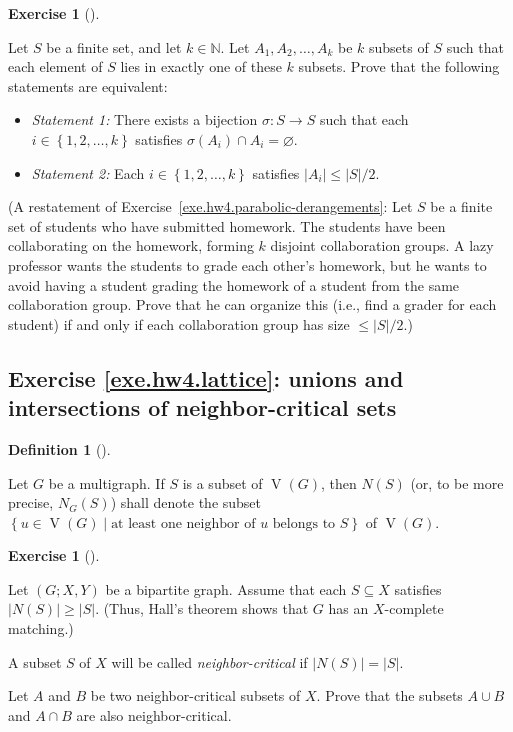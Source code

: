 \documentclass[numbers=enddot,12pt,final,onecolumn,notitlepage]{scrartcl}%
\newcounter{exer}
\theoremstyle{definition}
\newtheorem{defi}[theo]{Definition}
\newenvironment{definition}[1][]
{\begin{defi}[#1]\begin{leftbar}}
{\end{leftbar}\end{defi}}
\newtheorem{exmp}[exer]{Exercise}
\newenvironment{exercise}[1][]
{\begin{exmp}[#1]\begin{leftbar}}
{\end{leftbar}\end{exmp}}
\newcommand{\NN}{\mathbb{N}}
\newcommand{\set}[1]{\left\{ #1 \right\}}
\newcommand{\abs}[1]{\left| #1 \right|}
\newcommand{\tup}[1]{\left( #1 \right)}
\newcommand{\verts}[1]{\operatorname{V}\left( #1 \right)}
\begin{document}
\begin{exercise} \label{exe.hw4.parabolic-derangements}
Let $S$ be a finite set, and let $k \in \NN$.
Let $A_1, A_2, \ldots, A_k$ be $k$ subsets of $S$
such that each element of $S$ lies in exactly one of these $k$
subsets.
Prove that the following statements are equivalent:

\begin{itemize}
\item \textit{Statement 1:} There exists a bijection
      $\sigma : S \to S$ such that each $i \in \set{1, 2, \ldots, k}$
      satisfies $\sigma \tup{A_i} \cap A_i = \varnothing$.
\item \textit{Statement 2:} Each $i \in \set{1, 2, \ldots, k}$
      satisfies $\abs{A_i} \leq \abs{S} / 2$.
\end{itemize}
\end{exercise}

(A restatement of Exercise~\ref{exe.hw4.parabolic-derangements}:
Let $S$ be a finite set of students who have submitted homework.
The students have been collaborating on the homework, forming $k$
disjoint collaboration groups.
A lazy professor wants the students to grade each other's homework,
but he wants to avoid having a student grading the homework of a
student from the same collaboration group.
Prove that he can organize this (i.e., find a grader for each student)
if and only if each collaboration group has size $\leq \abs{S}/2$.)

\subsection{Exercise \ref{exe.hw4.lattice}: unions and intersections
of neighbor-critical sets}

\begin{definition}
Let $G$ be a multigraph.
If $S$ is a subset of $\verts{G}$, then
$N\tup{S}$ (or, to be more precise, $N_G\tup{S}$) shall denote the
subset
$\set{ u \in \verts{G} \mid \text{at least one neighbor of } u
                            \text{ belongs to } S }$
of $\verts{G}$.
\end{definition}

\begin{exercise} \label{exe.hw4.lattice}
Let $\tup{G; X, Y}$ be a bipartite graph.
Assume that each $S \subseteq X$ satisfies
$\abs{N\tup{S}} \geq \abs{S}$.
(Thus, Hall's theorem shows that $G$ has an $X$-complete matching.)

A subset $S$ of $X$ will be called \textit{neighbor-critical} if
$\abs{N\tup{S}} = \abs{S}$.

Let $A$ and $B$ be two neighbor-critical subsets of $X$.
Prove that the subsets $A \cup B$ and $A \cap B$ are also
neighbor-critical.
\end{exercise}
\end{document}
